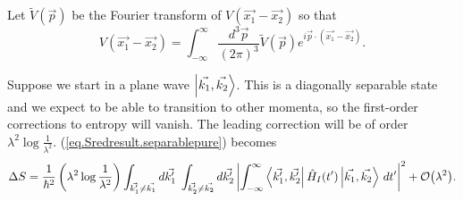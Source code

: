 Let \(\widetilde{V}(\vec{p})\) be the Fourier transform of \(V(\vec{x_1} - \vec{x_2})\) so that
\begin{equation}
\label{eq.ftV}
V(\vec{x_1} - \vec{x_2}) = \int_{-\infty}^{\infty} \frac{d^3 \vec{p}}{(2 \pi)^3} \widetilde{V}(\vec{p}) e^{i\vec{p}\cdot(\vec{x_1} - \vec{x_2})}.
\end{equation}

Suppose we start in a plane wave \(\left|\vec{k_1}, \vec{k_2}\right\rangle\). This is a diagonally separable state and we expect to be able to transition to other momenta, so the first-order corrections to entropy will vanish. The leading correction will be of order \(\lambda^2 \log \frac{1}{\lambda^2}
\). (\ref{eq.Sredresult.separablepure}) becomes
\begin{equation}\label{eq.ex-scattering.corstart}
\Delta S =\frac{1}{\hbar^2}\left(\lambda^2 \log\frac{1}{\lambda^2}\right) \int_{\vec{k_1^\prime}\neq \vec{k_1}} d\vec{k_1^\prime} \;\int_{\vec{k_2^\prime}\neq \vec{k_2}} d\vec{k_2^\prime} \left|\int_{-\infty}^\infty \left\langle\vec{k_1^\prime}, \vec{k_2^\prime}\right| \hat{H}_I (t^{\prime})\left|\vec{k_1}, \vec{k_2}\right\rangle \,dt^{\prime}\right|^2 + \mathcal{O}{\left(\lambda^2\right)}.
\end{equation}

